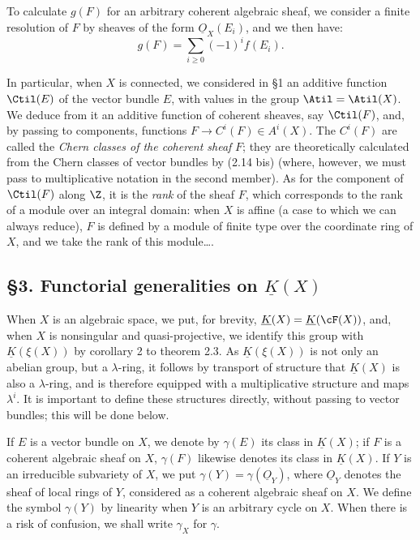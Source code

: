 To calculate $g(F)$ for an arbitrary coherent algebraic sheaf, we consider a finite resolution of $F$ by sheaves of the form $\underline{O}_X(E_i)$, and we then have:
\begin{equation}\tag{2.14 bis}
 g(F)=\sum_{i\geq0}(-1)^if(E_i).
\end{equation}

In particular, when $X$ is connected, we considered in \S 1 an additive function $\Ctil(E)$ of the vector bundle $E$, with values in the group $\Atil=\Atil(X)$. We deduce from it an additive function of coherent sheaves, say $\Ctil(F)$, and, by passing to components, functions $F\longrightarrow C^i(F)\in A^i(X)$. The $C^i(F)$ are called the \emph{Chern classes of the coherent sheaf} $F$; they are theoretically calculated from the Chern classes of vector bundles by (2.14 bis) (where, however, we must pass to multiplicative notation in the second member). As for the component of $\Ctil(F)$ along $\Z$, it is the \emph{rank} of the sheaf $F$, which corresponds to the rank of a module over an integral domain: when $X$ is affine (a case to which we can always reduce), $F$ is defined by a module of finite type over the coordinate ring of $X$, and we take the rank of this module\dots.

\subsection*{\S 3. Functorial generalities on $\underline{K}(X)$}

When $X$ is an algebraic space, we put, for brevity, $\underline{K}(X)=\underline{K}(\cF(X))$, and, when $X$ is nonsingular and quasi-projective, we identify this group with $\underline{K}(\xi(X))$ by corollary 2 to theorem 2.3. As $\underline{K}(\xi(X))$ is
%
not
only an abelian group, but a $\lambda$-ring, it follows by transport of structure that $\underline{K}(X)$ is also a $\lambda$-ring, and is therefore equipped with a multiplicative structure and maps $\lambda^i$. It is important to define these structures directly, without passing to vector bundles; this will be done below.

If $E$ is a vector bundle on $X$, we denote by $\gamma(E)$ its class in $\underline{K}(X)$; if $F$ is a coherent algebraic sheaf on $X$, $\gamma(F)$ likewise denotes its class in $\underline{K}(X)$. If $Y$ is an irreducible subvariety of $X$, we put $\gamma(Y)=\gamma(\underline{O}_Y)$, where $\underline{O}_Y$ denotes the sheaf of local rings of $Y$, considered as a coherent algebraic sheaf on $X$. We define the symbol $\gamma(Y)$ by linearity when $Y$ is an arbitrary cycle on $X$. When there is a risk of confusion, we shall write $\gamma_X$ for $\gamma$.


